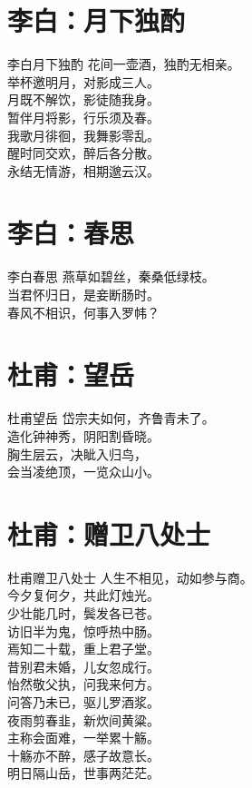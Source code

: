 \documentclass[12pt,oneside,a5paper]{book}
\begin{document}
\chapter{李白：月下独酌}
\begin{poemzh}{李白}{月下独酌}
花间一壶酒，独酌无相亲。\\
举杯邀明月，对影成三人。\\
月既不解饮，影徒随我身。\\
暂伴月将影，行乐须及春。\\
我歌月徘徊，我舞影零乱。\\
醒时同交欢，醉后各分散。\\
永结无情游，相期邈云汉。\\ 
\end{poemzh}

\chapter{李白：春思}
\begin{poemzh}{李白}{春思}
燕草如碧丝，秦桑低绿枝。\\
当君怀归日，是妾断肠时。\\
春风不相识，何事入罗帏？\\ 
\end{poemzh}

\chapter{杜甫：望岳}
\begin{poemzh}{杜甫}{望岳}
岱宗夫如何，齐鲁青未了。\\
造化钟神秀，阴阳割昏晓。\\
胸生层云，决眦入归鸟，\\
会当凌绝顶，一览众山小。\\ 
\end{poemzh}


\chapter{杜甫：赠卫八处士}
\begin{poemzh}{杜甫}{赠卫八处士}
人生不相见，动如参与商。\\
今夕复何夕，共此灯烛光。\\
少壮能几时，鬓发各已苍。\\
访旧半为鬼，惊呼热中肠。\\
焉知二十载，重上君子堂。\\
昔别君未婚，儿女忽成行。\\
怡然敬父执，问我来何方。\\
问答乃未已，驱儿罗酒浆。\\
夜雨剪春韭，新炊间黄粱。\\
主称会面难，一举累十觞。\\
十觞亦不醉，感子故意长。\\
明日隔山岳，世事两茫茫。\\ 
\end{poemzh}
\end{document}
